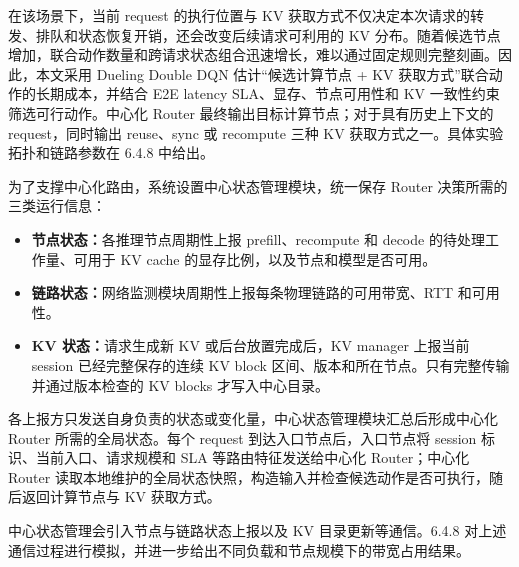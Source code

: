 在该场景下，当前 request 的执行位置与 KV 获取方式不仅决定本次请求的转发、排队和状态恢复开销，还会改变后续请求可利用的 KV 分布。随着候选节点增加，联合动作数量和跨请求状态组合迅速增长，难以通过固定规则完整刻画。因此，本文采用 Dueling Double DQN 估计“候选计算节点 + KV 获取方式”联合动作的长期成本，并结合 E2E latency SLA、显存、节点可用性和 KV 一致性约束筛选可行动作。中心化 Router 最终输出目标计算节点；对于具有历史上下文的 request，同时输出 reuse、sync 或 recompute 三种 KV 获取方式之一。具体实验拓扑和链路参数在 6.4.8 中给出。

为了支撑中心化路由，系统设置中心状态管理模块，统一保存 Router 决策所需的三类运行信息：
\begin{itemize}
    \item \textbf{节点状态：}各推理节点周期性上报 prefill、recompute 和 decode 的待处理工作量、可用于 KV cache 的显存比例，以及节点和模型是否可用。
    \item \textbf{链路状态：}网络监测模块周期性上报每条物理链路的可用带宽、RTT 和可用性。
    \item \textbf{KV 状态：}请求生成新 KV 或后台放置完成后，KV manager 上报当前 session 已经完整保存的连续 KV block 区间、版本和所在节点。只有完整传输并通过版本检查的 KV blocks 才写入中心目录。
\end{itemize}
各上报方只发送自身负责的状态或变化量，中心状态管理模块汇总后形成中心化 Router 所需的全局状态。每个 request 到达入口节点后，入口节点将 session 标识、当前入口、请求规模和 SLA 等路由特征发送给中心化 Router；中心化 Router 读取本地维护的全局状态快照，构造输入并检查候选动作是否可执行，随后返回计算节点与 KV 获取方式。

中心状态管理会引入节点与链路状态上报以及 KV 目录更新等通信。6.4.8 对上述通信过程进行模拟，并进一步给出不同负载和节点规模下的带宽占用结果。

